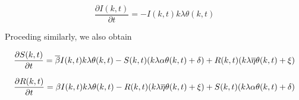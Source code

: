 \begin{equation}
\label{eq:ign_trans_diff}
\frac{\partial I(k,t)}{\partial t}=-I(k,t)k\lambda\theta(k,t)
\end{equation}

Proceding similarly, we also obtain

\begin{equation}
\label{eq:spr_trans_diff}
\frac{\partial S(k,t)}{\partial t}=\overline{\beta}I(k,t)k\lambda\theta(k,t)
-S(k,t)(k\lambda\alpha\theta(k,t)+\delta)\\
+R(k,t)(k\lambda\overline{\eta}\theta(k,t)+\xi)\\
\end{equation}

\begin{equation}
\label{eq:ret_trans_diff}
\frac{\partial R(k,t)}{\partial t}=\beta I(k,t)k\lambda\theta(k,t)
-R(k,t)(k\lambda\overline{\eta}\theta(k,t)+\xi)\\
+S(k,t)(k\lambda\alpha\theta(k,t)+\delta)\\
\end{equation}
